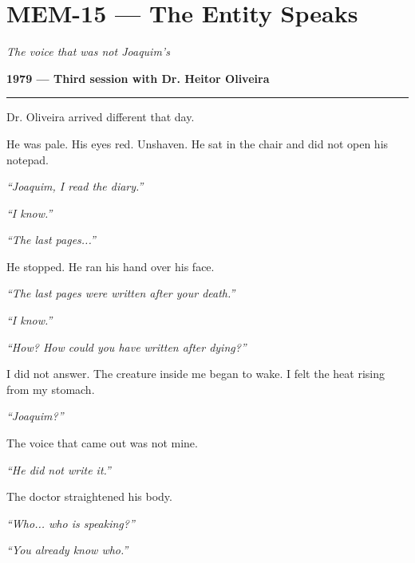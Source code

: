 \section*{\textbf{MEM-15} --- The Entity Speaks}

\noindent \textit{The voice that was not Joaquim's}

\noindent \textbf{1979 --- Third session with Dr. Heitor Oliveira}

\vspace{0.5em}\noindent\rule{\textwidth}{0.5pt}\vspace{0.5em}

\noindent Dr. Oliveira arrived different that day.

\noindent He was pale. His eyes red. Unshaven. He sat in the chair and did not open his notepad.

\noindent \textit{\textquotedblleft{}Joaquim, I read the diary.\textquotedblright{}}

\noindent \textit{\textquotedblleft{}I know.\textquotedblright{}}

\noindent \textit{\textquotedblleft{}The last pages...\textquotedblright{}}

\noindent He stopped. He ran his hand over his face.

\noindent \textit{\textquotedblleft{}The last pages were written after your death.\textquotedblright{}}

\noindent \textit{\textquotedblleft{}I know.\textquotedblright{}}

\noindent \textit{\textquotedblleft{}How? How could you have written after dying?\textquotedblright{}}

\noindent I did not answer. The creature inside me began to wake. I felt the heat rising from my stomach.

\noindent \textit{\textquotedblleft{}Joaquim?\textquotedblright{}}

\noindent The voice that came out was not mine.

\noindent \textit{\textquotedblleft{}He did not write it.\textquotedblright{}}

\noindent The doctor straightened his body.

\noindent \textit{\textquotedblleft{}Who... who is speaking?\textquotedblright{}}

\noindent \textit{\textquotedblleft{}You already know who.\textquotedblright{}}

